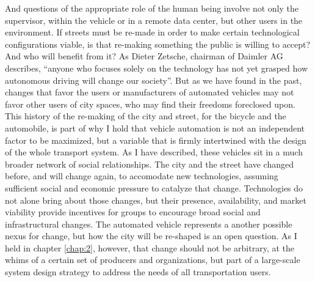 And questions of the appropriate role of the human being involve not
only the supervisor, within the vehicle or in a remote data center,
but other users in the environment. If streets must be re-made in
order to make certain technological configurations viable, is that
re-making something the public is willing to accept? And who will
benefit from it? As Dieter Zetsche, chairman of Daimler AG describes,
``anyone who focuses solely on the technology has not yet grasped how 
autonomous driving will change our
society''\cite{???-http://www.slashgear.com/how-mercedes-f-015-self-driving-car-is-shaping-smart-cities-20374602/}.
But as we have found in the past, changes that favor the users or
manufacturers of automated vehicles may not favor other users of city
spaces, who may find their freedoms foreclosed upon. This history of
the re-making of the city and street, for the bicycle and the
automobile, is part of why I hold that vehicle automation is not an
independent factor to be maximized, but a variable that is firmly
intertwined with the design of the whole transport system.
As I have described, these vehicles sit in a much broader network of
social relationships. The city and the street have changed before, and
will change again, to accomodate new technologies, assuming sufficient
social and economic pressure to catalyze that change. Technologies do
not alone bring about those changes, but their presence, availability,
and market viability provide incentives for groups to encourage broad
social and infrastructural changes. The automated vehicle represents a
another possible nexus for change, but how the city will be re-shaped
is an open question. As I held in chapter \ref{chap:2}, however, that
change should not be arbitrary, at the whims of a certain set of
producers and organizations, but part of a large-scale system design
strategy to address the needs of all transportation users.
